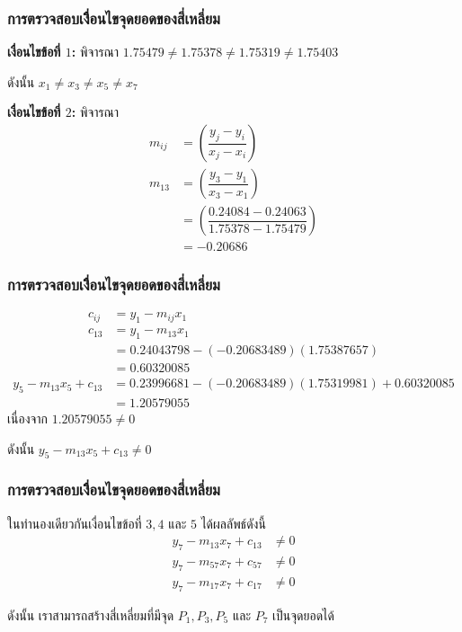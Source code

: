 \documentclass[12pt,aspectratio=169]{beamer}
\begin{document}
\begin{frame}
    \frametitle{การตรวจสอบเงื่ิอนไขจุดยอดของสี่เหลี่ยม}
        \textbf{เงื่อนไขข้อที่ $1$:} พิจารณา $1.75479 \neq 1.75378 \neq 1.75319 \neq 1.75403$

ดังนั้น  $x_1 \neq x_3 \neq x_5 \neq x_7$

\vspace{1cm}
\textbf{เงื่อนไขข้อที่ $2$:} พิจารณา
\begin{align*} 
m_{ij} &=\left(\dfrac{y_j-y_i}{x_j-x_i} \right)\\
m_{13} &=\left(\dfrac{y_3-y_1}{x_3-x_1} \right)\\
       &=\left(\dfrac{0.24084-0.24063}{1.75378-1.75479} \right)\\
       &=-0.20686
\end{align*}
\end{frame}

\begin{frame}
    \frametitle{การตรวจสอบเงื่ิอนไขจุดยอดของสี่เหลี่ยม}
\begin{align*} 
    c_{ij} &= y_1-m_{ij}x_1\\ 
    c_{13} &= y_1-m_{13}x_1\\
           &= 0.24043798-(-0.20683489)(1.75387657)\\
           &= 0.60320085
\end{align*}
\begin{align*} 
    y_5 - m_{13}x_5 + c_{13} & = 0.23996681 -(-0.20683489)(1.75319981) + 0.60320085\\
   & = 1.20579055
\end{align*}
เนื่องจาก $1.20579055 \neq 0$

ดังนั้น $y_5 - m_{13}x_5 + c_{13} \neq 0 $
\end{frame}

\begin{frame}
    \frametitle{การตรวจสอบเงื่ิอนไขจุดยอดของสี่เหลี่ยม}
    ในทำนองเดียวกันเงื่อนไขข้อที่ $3,4$ และ $5$ ได้ผลลัพธ์ดังนี้
\begin{align*}
    y_7 - m_{13}x_7 + c_{13} &\neq 0\\
    y_7 - m_{57}x_7 + c_{57} &\neq 0\\
    y_7 - m_{17}x_7 + c_{17} &\neq 0
    \end{align*}

    \vspace{0.5cm}
    ดังนั้น เราสามารถสร้างสี่เหลี่ยมที่มีจุด $P_1,P_3,P_5$ และ $P_7$ เป็นจุดยอดได้
\end{frame}
\end{document}
